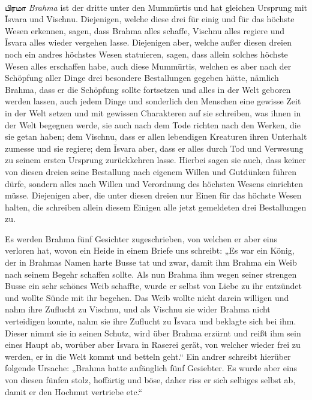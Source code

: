 \documentclass{article}
\newcommand{\TamilText}[1]{\texttamil{#1}}
\newcommand{\tam}[1]{\TamilText{#1}}
\begin{document}
\paragraph{}
\tam{பிரமா} \emph{Brahma} ist der dritte unter den Mumm\={u}rtis und hat gleichen Ursprung mit \={I}svara und Vischnu. Diejenigen, welche diese drei für einig und für das höchste Wesen erkennen, sagen, dass Brahma alles schaffe, Vischnu alles regiere und \={I}svara alles wieder vergehen lasse. Diejenigen aber, welche außer diesen dreien noch ein andres höchstes Wesen statuieren, sagen, dass allein solches höchste Wesen alles erschaffen habe, auch diese Mumm\={u}rtis, welchen es aber nach der Schöpfung aller Dinge drei besondere Bestallungen gegeben hätte, nämlich Brahma, dass er die Schöpfung sollte fortsetzen und alles in der Welt geboren werden lassen, auch jedem Dinge und sonderlich den Menschen eine gewisse Zeit in der Welt setzen und mit gewissen Charakteren auf sie schreiben, was ihnen in der Welt begegnen werde, sie auch nach dem Tode richten nach den Werken, die sie getan haben; dem Vischnu, dass er allen lebendigen Kreaturen ihren Unterhalt zumesse und sie regiere; dem \={I}svara aber, dass er alles durch Tod und Verwesung zu seinem ersten Ursprung zurückkehren lasse. Hierbei sagen sie auch, dass keiner von diesen dreien seine Bestallung nach eigenem Willen und Gutdünken führen dürfe, sondern alles nach Willen und Verordnung des höchsten Wesens einrichten müsse. Diejenigen aber, die unter diesen dreien nur Einen für das höchste Wesen halten, die schreiben allein diesem Einigen alle jetzt gemeldeten drei Bestallungen zu.

Es werden Brahma fünf Gesichter zugeschrieben, von welchen er aber eins verloren hat, wovon ein Heide in einem Briefe uns schreibt: „Es war ein König, der in Brahmas Namen harte Busse tat und zwar, damit ihm Brahma ein Weib nach seinem Begehr schaffen sollte. Als nun Brahma ihm wegen seiner strengen Busse ein sehr schönes Weib schaffte, wurde er selbst von Liebe zu ihr entzündet und wollte Sünde mit ihr begehen. Das Weib wollte nicht darein willigen und nahm ihre Zuflucht zu Vischnu, und als Vischnu sie wider Brahma nicht verteidigen konnte, nahm sie ihre Zuflucht zu \={I}svara und beklagte sich bei ihm. Dieser nimmt sie in seinen Schutz, wird über Brahma erzürnt und reißt ihm sein eines Haupt ab, worüber aber \={I}svara in Raserei gerät, von welcher wieder frei zu werden, er in die Welt kommt und betteln geht.“ Ein andrer schreibt hierüber folgende Ursache: „Brahma hatte anfänglich fünf Gesiebter. Es wurde aber eins von diesen fünfen stolz, hoffärtig und böse, daher riss er sich selbiges selbst ab, damit er den Hochmut vertriebe etc.“
\end{document}
